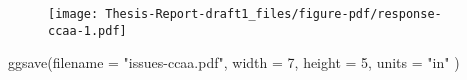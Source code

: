 \documentclass[
]{report}
\newenvironment{Shaded}{\begin{snugshade}}{\end{snugshade}}
\newcommand{\AttributeTok}[1]{\textcolor[rgb]{0.40,0.45,0.13}{#1}}
\newcommand{\DecValTok}[1]{\textcolor[rgb]{0.68,0.00,0.00}{#1}}
\newcommand{\FunctionTok}[1]{\textcolor[rgb]{0.28,0.35,0.67}{#1}}
\newcommand{\NormalTok}[1]{\textcolor[rgb]{0.00,0.23,0.31}{#1}}
\newcommand{\StringTok}[1]{\textcolor[rgb]{0.13,0.47,0.30}{#1}}
\begin{document}
\begin{figure}[H]

{\centering \texttt{[image: Thesis-Report-draft1\_files/figure-pdf/response-ccaa-1.pdf]}

}

\end{figure}

\begin{Shaded}
\begin{Highlighting}[]
\FunctionTok{ggsave}\NormalTok{(}\AttributeTok{filename =} \StringTok{"issues{-}ccaa.pdf"}\NormalTok{, }\AttributeTok{width =} \DecValTok{7}\NormalTok{, }\AttributeTok{height =} \DecValTok{5}\NormalTok{, }\AttributeTok{units =} \StringTok{"in"}\NormalTok{ )}
\end{Highlighting}
\end{Shaded}
\end{document}
